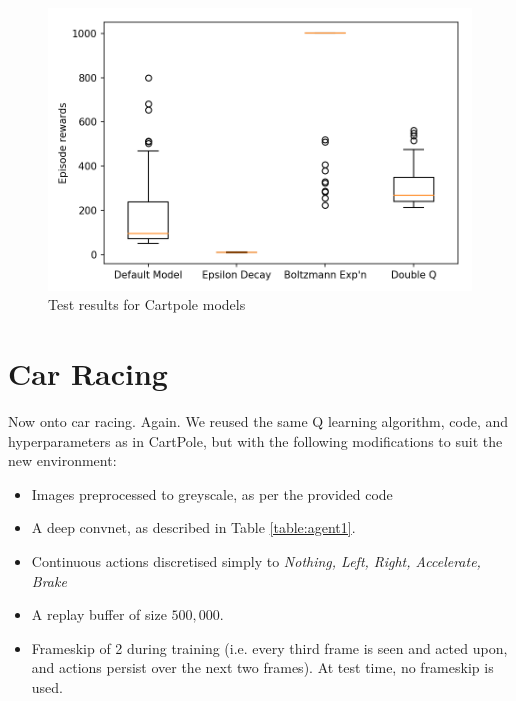 \documentclass[a4paper, 11pt, conference]{ieeeconf}      %
\begin{document}
\begin{figure}
  \includegraphics[width=\linewidth]{figs/cartpole_test.png}
  \caption{Test results for Cartpole models}
  \label{fig:test0}
\end{figure}

\section{Car Racing}

Now onto car racing. Again. We reused the same Q learning algorithm, code, and hyperparameters as in CartPole, but with the following modifications to suit the new environment:

\begin{itemize}
	\item Images preprocessed to greyscale, as per the provided code
	
	\item A deep convnet, as described in Table \ref{table:agent1}.
	
  \item Continuous actions discretised simply to \textit{Nothing, Left, Right, Accelerate, Brake}
  
  \item A replay buffer of size $500,000$.
  
  \item Frameskip of 2 during training (i.e. every third frame is seen and acted upon, and actions persist over the next two frames). At test time, no frameskip is used.
	
\end{itemize}
\end{document}
